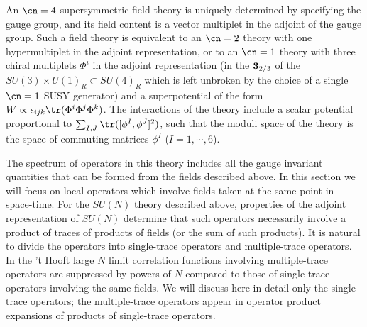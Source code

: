 An $\cn=4$ supersymmetric field theory is uniquely determined by
specifying the gauge group, and its field content is a vector
multiplet in the adjoint of the gauge group. Such a field theory is
equivalent to an $\cn=2$ theory with one hypermultiplet in the adjoint
representation, or to an $\cn=1$ theory with three chiral multiplets
$\Phi^i$ in the adjoint representation (in the ${\bf 3}_{2/3}$ of the
$SU(3)\times U(1)_R
\subset SU(4)_R$ which is left unbroken by the choice of a single
$\cn=1$ SUSY generator) and a superpotential of the form $W \propto
\epsilon_{ijk} \tr(\Phi^i \Phi^j \Phi^k)$. The interactions of the
theory include a scalar potential proportional to $\sum_{I,J}
\tr([\phi^I,\phi^J]^2)$, such that the moduli space of the theory is
the space of commuting matrices $\phi^I$ ($I=1,\cdots,6$).

The spectrum of operators in this theory includes all the gauge
invariant quantities that can be formed from the fields described
above. In this section we will focus on local operators which involve
fields taken at the same point in space-time. For the $SU(N)$ theory
described above, properties of the adjoint representation of $SU(N)$
determine that such operators necessarily involve a product of traces
of products of fields (or the sum of such products). It is natural to
divide the operators into single-trace operators and multiple-trace
operators. In the 't Hooft large $N$ limit correlation
functions involving multiple-trace operators are suppressed by powers
of $N$ compared to those of single-trace operators involving the same
fields. We will discuss here in detail only the single-trace
operators; the multiple-trace operators appear in operator product
expansions of products of single-trace operators.


